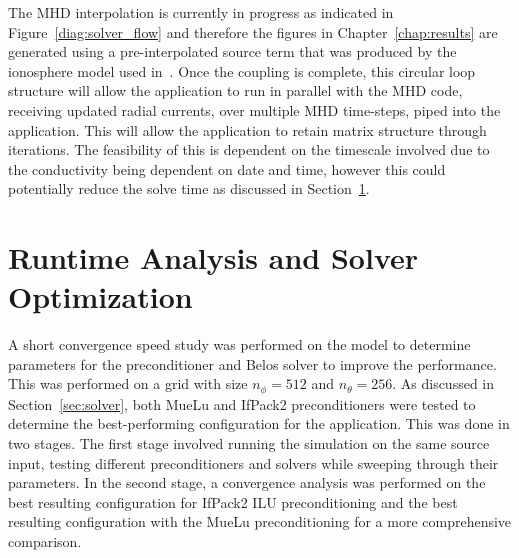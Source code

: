 The MHD interpolation is currently in progress as indicated in Figure~\ref{diag:solver_flow} and therefore the figures in Chapter~\ref{chap:results} are generated using a pre-interpolated source term that was produced by the ionosphere model used in~\citet{global_groth_2000}. Once the coupling is complete, this circular loop structure will allow the application to run in parallel with the MHD code, receiving updated radial currents, over multiple MHD time-steps, piped into the application. This will allow the application to retain matrix structure through iterations. The feasibility of this is dependent on the timescale involved due to the conductivity being dependent on date and time, however this could potentially reduce the solve time as discussed in Section~\ref{sec:convergence_study}.

\section{Runtime Analysis and Solver Optimization}
\label{sec:convergence_study}
A short convergence speed study was performed on the model to determine parameters for the preconditioner and Belos solver to improve the performance. This was performed on a grid with size $n_\phi = 512$ and $n_\theta=256$. As discussed in Section~\ref{sec:solver}, both MueLu and IfPack2 preconditioners were tested to determine the best-performing configuration for the application. This was done in two stages. The first stage involved running the simulation on the same source input, testing different preconditioners and solvers while sweeping through their parameters. In the second stage, a convergence analysis was performed on the best resulting configuration for IfPack2 ILU preconditioning and the best resulting configuration with the MueLu preconditioning for a more comprehensive comparison.
